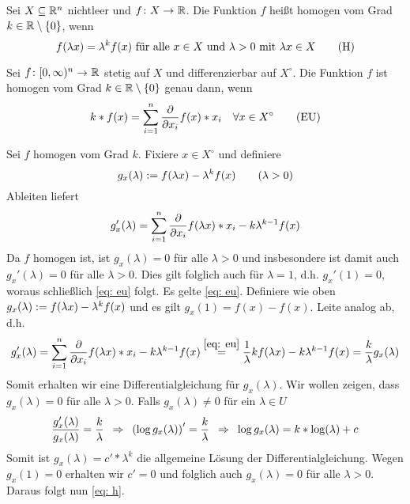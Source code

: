 \begin{*definition}
	Sei $X \subseteq \mathbb{R}^n$ nichtleer und $\abb{f}{X}{\R}$. Die Funktion $f$ heißt homogen vom Grad $k \in \mathbb{R}\setminus\left\{ 0 \right\}$, wenn
	\begin{equation*}
		f(\lambda x) = \lambda^k f(x) \text{ für alle } x \in X \text{ und } \lambda > 0  \text{ mit } \lambda x \in X
		\tag{H} \label{eq: h}
	\end{equation*}
\end{*definition}

\begin{theorem}
	Sei $\abb{f}{[0,\infty)^n}{\R}$ stetig auf $X$ und differenzierbar auf $X^\circ$. Die Funktion $f$ ist homogen vom Grad $k \in \mathbb{R}\setminus\left\{ 0 \right\}$ genau dann, wenn
	\begin{equation*}
		k * f(x) = \sum_{i = 1}^n \frac{\partial}{\partial x_i } f(x) * x_i \quad \forall x \in X^\circ
		\tag{EU} \label{eq: eu}
	\end{equation*}
\end{theorem}
\begin{proof_equiv}
	\hinrichtung Sei $f$ homogen vom Grad $k$. Fixiere $x \in X^\circ$ und definiere
	\begin{equation*}
		g_x(\lambda) \mathrel{:=} f(\lambda x) - \lambda^k f(x) \qquad (\lambda > 0)
	\end{equation*}
	Ableiten liefert
	\begin{equation*}
		g_x'(\lambda) = \sum_{i = 1}^n \frac{\partial}{\partial x_i } f(\lambda x) * x_i - k \lambda^{k-1} f(x)
	\end{equation*}
	Da $f$ homogen ist, ist $g_x(\lambda) = 0$ für alle $\lambda > 0$ und insbesondere ist damit auch $g_x'(\lambda) = 0$ für alle $\lambda > 0$. Dies gilt folglich auch für $\lambda = 1$, d.h. $g_x'(1) = 0$, woraus schließlich \eqref{eq: eu} folgt.
	\rueckrichtung Es gelte \eqref{eq: eu}. Definiere wie oben $g_x(\lambda) \mathrel{:=} f(\lambda x) - \lambda^k f(x)$ und es gilt $g_x(1) = f(x) - f(x)$. Leite analog ab, d.h. 
	\begin{equation*}
		g_x'(\lambda) = \sum_{i = 1}^n \frac{\partial}{\partial x_i } f(\lambda x) * x_i - k \lambda^{k-1} f(x) \overset{\eqref{eq: eu}}{=} \frac{1}{\lambda} k f(\lambda x) - k \lambda^{k-1} f(x) = \frac{k}{\lambda} g_x(\lambda)
	\end{equation*}
	Somit erhalten wir eine Differentialgleichung für $g_x(\lambda)$. Wir wollen zeigen, dass $g_x(\lambda) = 0$ für alle $\lambda > 0$. Falls $g_x(\lambda) \neq 0$ für ein $\lambda \in U$
	\begin{equation*}
		\frac{g_x'(\lambda)}{g_x(\lambda)} = \frac{k}{\lambda} \enskip \Rightarrow \enskip \left( \log g_x(\lambda) \right)' = \frac{k}{\lambda} \enskip \Rightarrow \enskip\log g_x(\lambda) = k * \log(\lambda) + c
	\end{equation*}
	Somit ist $g_x(\lambda) = c' * \lambda^k$ die allgemeine Lösung der Differentialgleichung. Wegen $g_x(1) = 0$ erhalten wir $c' = 0$ und folglich auch $g_x(\lambda) = 0$ für alle $\lambda > 0$. Daraus folgt nun \eqref{eq: h}.
\end{proof_equiv}

